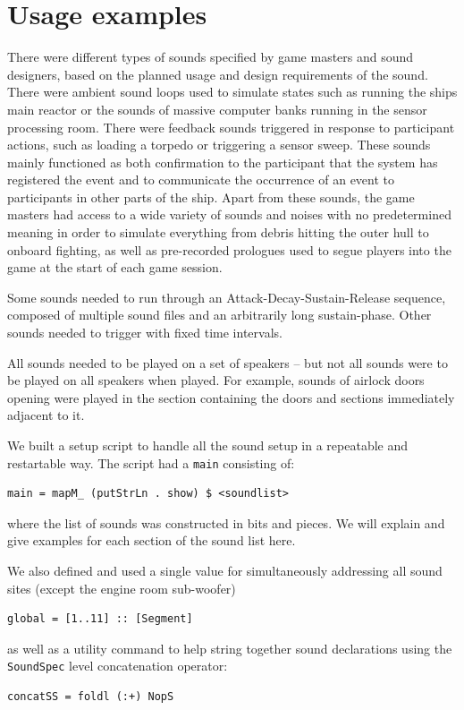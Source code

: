 \section{Usage examples}


There were different types of sounds specified by game masters and sound designers, based on the planned usage and design requirements of the sound. There were ambient sound loops used to simulate states such as running the ships main reactor or the sounds of massive computer banks running in the sensor processing room. There were feedback sounds triggered in response to participant actions, such as loading a torpedo or triggering a sensor sweep. These sounds mainly functioned as both confirmation to the participant that the system has registered the event and to communicate the occurrence of an event to participants in other parts of the ship. Apart from these sounds, the game masters had access to a wide variety of sounds and noises with no predetermined meaning in order to simulate everything from debris hitting the outer hull to onboard fighting, as well as pre-recorded prologues used to segue players into the game at the start of each game session.

Some sounds needed to run through an Attack-Decay-Sustain-Release sequence, composed of multiple sound files and an arbitrarily long sustain-phase. Other sounds needed to trigger with fixed time intervals.

All sounds needed to be played on a set of speakers -- but not all sounds were to be played on all speakers when played. For example, sounds of airlock doors opening were played in the section containing the doors and sections immediately adjacent to it.

We built a setup script to handle all the sound setup in a repeatable and restartable way. The script had a \texttt{main} consisting of:
\begin{verbatim}
main = mapM_ (putStrLn . show) $ <soundlist>
\end{verbatim}
where the list of sounds was constructed in bits and pieces. We will explain and give examples for each section
of the sound list here.

We also defined and used a
single value for simultaneously addressing all sound sites (except the engine room
sub-woofer)
\begin{verbatim}
global = [1..11] :: [Segment] 
\end{verbatim}
as well as a utility command to help string together sound
declarations using the \texttt{SoundSpec} level concatenation
operator:
\begin{verbatim}
concatSS = foldl (:+) NopS
\end{verbatim}

